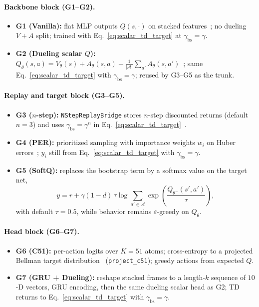 \documentclass[letterpaper]{article}
\begin{document}
\paragraph{Backbone block (G1--G2).}
\begin{itemize}[leftmargin=1.2em]
    \item \textbf{G1 (Vanilla):} flat MLP outputs $Q(s,\cdot)$ on stacked features~\cite{mnih2015human}; no dueling $V{+}A$ split; trained with Eq.~\eqref{eq:scalar_td_target} at $\gamma_{\mathrm{bs}}=\gamma$.
    \item \textbf{G2 (Dueling scalar $Q$):} $Q_\theta(s,a)=V_\theta(s)+A_\theta(s,a)-\frac{1}{|\mathcal{A}|}\sum_{a'}A_\theta(s,a')$~\cite{wang2016dueling}; same Eq.~\eqref{eq:scalar_td_target} with $\gamma_{\mathrm{bs}}=\gamma$; reused by G3--G5 as the trunk.
\end{itemize}

\paragraph{Replay and target block (G3--G5).}
\begin{itemize}[leftmargin=1.2em]
    \item \textbf{G3 ($n$-step):} \texttt{NStepReplayBridge} stores $n$-step discounted returns (default $n{=}3$) and uses $\gamma_{\mathrm{bs}}=\gamma^{n}$ in Eq.~\eqref{eq:scalar_td_target}~\cite{hessel2018rainbow}.
    \item \textbf{G4 (PER):} prioritized sampling with importance weights $w_i$ on Huber errors~\cite{schaul2015per}; $y_i$ still from Eq.~\eqref{eq:scalar_td_target} with $\gamma_{\mathrm{bs}}=\gamma$.
    \item \textbf{G5 (SoftQ):} replaces the bootstrap term by a softmax value on the target net,
    \[
    y = r + \gamma(1-d)\,\tau\log\sum_{a'\in\mathcal{A}}\exp\!\left(\frac{Q_{\theta^-}(s',a')}{\tau}\right),
    \]
    with default $\tau{=}0.5$, while behavior remains $\varepsilon$-greedy on $Q_\theta$.
\end{itemize}

\paragraph{Head block (G6--G7).}
\begin{itemize}[leftmargin=1.2em]
    \item \textbf{G6 (C51):} per-action logits over $K{=}51$ atoms; cross-entropy to a projected Bellman target distribution~\cite{bellemare2017distributional} (\texttt{project\_c51}); greedy actions from expected $Q$.
    \item \textbf{G7 (GRU + Dueling):} reshape stacked frames to a length-$k$ sequence of $10$-D vectors, GRU encoding, then the same dueling scalar head as G2; TD returns to Eq.~\eqref{eq:scalar_td_target} with $\gamma_{\mathrm{bs}}=\gamma$.
\end{itemize}
\end{document}
